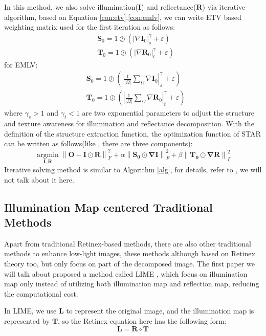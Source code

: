\documentclass[10pt,twocolumn,letterpaper]{article}
\begin{document}
In this method, we also solve illumination($\mathbf{I}$) and reflectance($\mathbf{R}$) via iterative algorithm, based on Equation \ref{con:etv},\ref{con:emlv}, we can write ETV based weighting matrix used for the first iteration as follows:
\begin{align}
    &\mathbf{S}_0 = 1 \oslash (|\nabla \mathbf{I}_0|^\gamma_s + \varepsilon) \\
    &\mathbf{T}_0 = 1 \oslash (|\nabla \mathbf{R}_0|^\gamma_t + \varepsilon)
\end{align}
for EMLV:
\begin{align}
    &\mathbf{S}_0 = 1 \oslash (|\frac{1}{|\Omega|}\sum_\Omega \nabla \mathbf{I}_0 |^\gamma_s + \varepsilon) \\
    &\mathbf{T}_0 = 1 \oslash (|\frac{1}{|\Omega|}\sum_\Omega \nabla \mathbf{R}_0 |^\gamma_t + \varepsilon)
\end{align}
where $\gamma_s > 1$ and $\gamma_t < 1$ are two exponential parameters
to adjust the structure and texture awareness for illumination
and reflectance decomposition.
With the definition of the structure extraction function, the optimization function of STAR can be written as follows(like \cite{LiStructure}, there are three components):
\begin{equation}
    \mathop{\arg\min}\limits_\mathbf{I,R} \left\|\mathbf{O - I \odot R}\right\|_F^2 + \alpha \left\|\mathbf{S_0 \odot \nabla I }\right\|_F^2 + \beta \left\|\mathbf{T_0 \odot \nabla R }\right\|_F^2
\end{equation}
Iterative solving method is similar to Algorithm \ref{alg}, for details, refer to \cite{Xu2019STAR}, we will not talk about it here.

\subsection{Illumination Map centered Traditional Methods}
Apart from traditional Retinex-based methods, there are also other traditional methods to enhance low-light images, these methods although based on Retinex theory too, but only focus on part of the decomposed image. The first paper we will talk about proposed a method called LIME \cite{guo2016lime}, which focus on illumination map only instead of utilizing both illumination map and reflection map, reducing the computational cost.

 In LIME, we use $\mathbf{L}$ to represent the original image, and the illumination map is represented by $\mathbf{T}$, so the Retinex equation here has the following form:
 \begin{equation}
    \mathbf{L = R \circ T} \label{con:retinexmodel3}
\end{equation}
\end{document}
